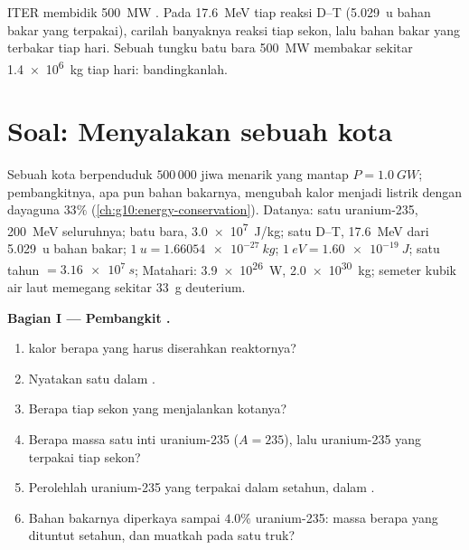 \begin{exercise}[$\star\star\star$]\label{exo:g12:nuclear-energy:15}
ITER membidik \qty{500}{MW}  . Pada \qty{17.6}{MeV} tiap reaksi D--T
(\qty{5.029}{u} bahan bakar yang terpakai), carilah banyaknya reaksi tiap sekon,
lalu bahan bakar yang terbakar tiap hari. Sebuah tungku batu bara \qty{500}{MW} membakar sekitar
\qty{1.4e6}{kg} tiap hari: bandingkanlah.
\end{exercise}

\section{Soal: Menyalakan sebuah kota}

\begin{problem}
\label{pb:g12:nuclear-energy:1}
Sebuah kota berpenduduk $500\,000$ jiwa menarik  yang mantap
$P = \qty{1.0}{GW}$; pembangkitnya, apa pun bahan bakarnya, mengubah kalor menjadi
listrik dengan dayaguna $33\%$ (\cref{ch:g10:energy-conservation}).
Datanya: satu  uranium-235, \qty{200}{MeV} seluruhnya; batu bara, \qty{3.0e7}{J/kg};
satu  D--T, \qty{17.6}{MeV} dari \qty{5.029}{u} bahan bakar;
$\qty{1}{u} = \qty{1.66054e-27}{kg}$; $\qty{1}{eV} = \qty{1.60e-19}{J}$; satu
tahun $= \qty{3.16e7}{s}$; Matahari: \qty{3.9e26}{W}, \qty{2.0e30}{kg}; semeter
kubik air laut memegang sekitar \qty{33}{g} deuterium.

\medskip
\noindent\textbf{Bagian I --- Pembangkit .}
\begin{enumerate}
  \item {} kalor berapa yang harus diserahkan reaktornya?
  \item Nyatakan  satu  dalam .
  \item Berapa  tiap sekon yang menjalankan kotanya?
  \item Berapa massa satu inti uranium-235 ($A = 235$), lalu uranium-235
        yang terpakai tiap sekon?
  \item Perolehlah uranium-235 yang terpakai dalam setahun, dalam .
  \item Bahan bakarnya diperkaya sampai $4.0\%$ uranium-235: massa berapa yang
        dituntut setahun, dan muatkah pada satu truk?
\end{enumerate}


\end{problem}
